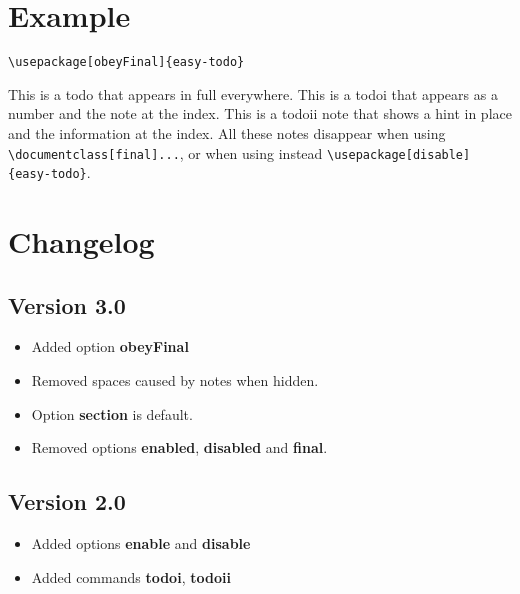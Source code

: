 \documentclass[a4paper]{article}
\begin{document}
    \section{Example}	
    	\texttt{\textbackslash usepackage[obeyFinal]\{easy-todo\}}
    
	This is a todo  that appears in full everywhere. This is a todoi   that appears as a number and the note at the index. This is a todoii  note that shows a hint in place and the information at the index. All these notes disappear when using \texttt{\textbackslash documentclass[final]...}, or when using instead \texttt{\textbackslash usepackage[disable]\{easy-todo\}}.
	
    \section{Changelog}
    
    \subsection{Version 3.0}
        \begin{itemize}
        \item Added option \textbf{obeyFinal}
        \item Removed spaces caused by notes when hidden.
        \item Option \textbf{section} is default.
        \item Removed options \textbf{enabled}, \textbf{disabled} and \textbf{final}.
        \end{itemize}
    
    \subsection{Version 2.0}
        \begin{itemize}
            \item Added options \textbf{enable} and \textbf{disable}
            \item Added commands \textbf{todoi}, \textbf{todoii}
        \end{itemize}
    
    \listoftodos
\end{document}
